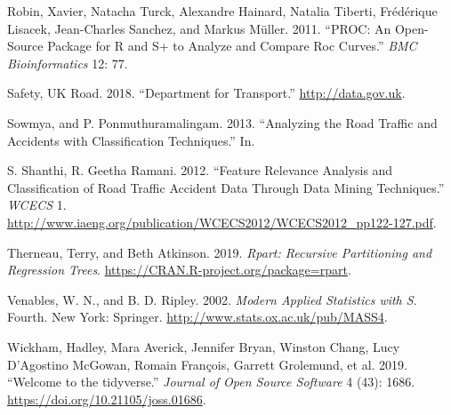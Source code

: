 \documentclass[
  a4paper,
]{article}
\begin{document}
\leavevmode\hypertarget{ref-proc}{}%
Robin, Xavier, Natacha Turck, Alexandre Hainard, Natalia Tiberti,
Frédérique Lisacek, Jean-Charles Sanchez, and Markus Müller. 2011.
``PROC: An Open-Source Package for R and S+ to Analyze and Compare Roc
Curves.'' \emph{BMC Bioinformatics} 12: 77.

\leavevmode\hypertarget{ref-ukgov}{}%
Safety, UK Road. 2018. ``Department for Transport.''
\url{http://data.gov.uk}.

\leavevmode\hypertarget{ref-Sowmya}{}%
Sowmya, and P. Ponmuthuramalingam. 2013. ``Analyzing the Road Traffic
and Accidents with Classification Techniques.'' In.

\leavevmode\hypertarget{ref-shanthi}{}%
S. Shanthi, R. Geetha Ramani. 2012. ``Feature Relevance Analysis and
Classification of Road Traffic Accident Data Through Data Mining
Techniques.'' \emph{WCECS} 1.
\url{http://www.iaeng.org/publication/WCECS2012/WCECS2012_pp122-127.pdf}.

\leavevmode\hypertarget{ref-rpart}{}%
Therneau, Terry, and Beth Atkinson. 2019. \emph{Rpart: Recursive
Partitioning and Regression Trees}.
\url{https://CRAN.R-project.org/package=rpart}.

\leavevmode\hypertarget{ref-mass}{}%
Venables, W. N., and B. D. Ripley. 2002. \emph{Modern Applied Statistics
with S}. Fourth. New York: Springer.
\url{http://www.stats.ox.ac.uk/pub/MASS4}.

\leavevmode\hypertarget{ref-tidyverse}{}%
Wickham, Hadley, Mara Averick, Jennifer Bryan, Winston Chang, Lucy
D'Agostino McGowan, Romain François, Garrett Grolemund, et al. 2019.
``Welcome to the tidyverse.'' \emph{Journal of Open Source Software} 4
(43): 1686. \url{https://doi.org/10.21105/joss.01686}.
\end{document}
